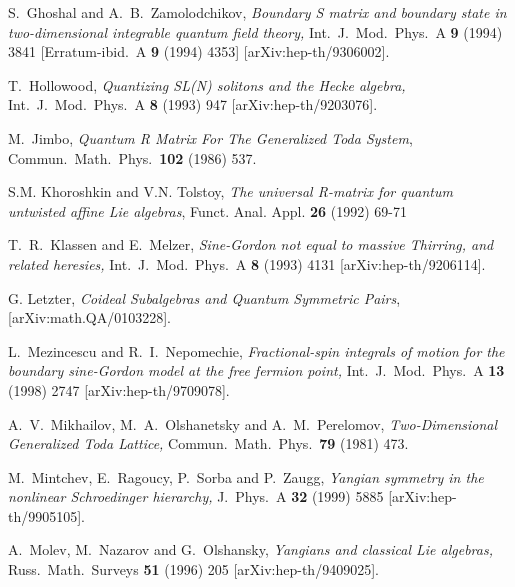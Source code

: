 \documentclass[a4paper,12pt]{article}
\numberwithin{equation}{section}
\begin{document}
{\begin{thebibliography}{99}
S.~Ghoshal and A.~B.~Zamolodchikov, \textit{Boundary S matrix and
boundary state in two-dimensional integrable quantum field
theory,} Int.\ J.\ Mod.\ Phys.\ A {\bf 9} (1994) 3841
[Erratum-ibid.\ A {\bf 9} (1994) 4353] [arXiv:hep-th/9306002].


T.~Hollowood, \textit{Quantizing SL(N) solitons and the Hecke
algebra,} Int.\ J.\ Mod.\ Phys.\ A {\bf 8} (1993) 947
[arXiv:hep-th/9203076].


M.~Jimbo, \textit{Quantum R Matrix For The Generalized Toda
System}, Commun.\ Math.\ Phys.\  {\bf 102} (1986) 537.

 S.M. Khoroshkin and V.N. Tolstoy, \textit{The
universal R-matrix for quantum untwisted affine Lie algebras},
Funct. Anal. Appl. {\bf 26} (1992) 69-71

T.~R.~Klassen and E.~Melzer, \textit{Sine-Gordon not equal to
massive Thirring, and related heresies,} Int.\ J.\ Mod.\ Phys.\ A
{\bf 8} (1993) 4131 [arXiv:hep-th/9206114].


 G. Letzter, \textit{Coideal Subalgebras and Quantum Symmetric
Pairs}, [arXiv:math.QA/0103228].

L.~Mezincescu and R.~I.~Nepomechie, \textit{Fractional-spin
integrals of motion for the boundary sine-Gordon model  at the
free fermion point,} Int.\ J.\ Mod.\ Phys.\ A {\bf 13} (1998) 2747
[arXiv:hep-th/9709078].


A.~V.~Mikhailov, M.~A.~Olshanetsky and A.~M.~Perelomov,
\textit{Two-Dimensional Generalized Toda Lattice,} Commun.\ Math.\
Phys.\  {\bf 79} (1981) 473.


M.~Mintchev, E.~Ragoucy, P.~Sorba and P.~Zaugg, \textit{Yangian
symmetry in the nonlinear Schroedinger hierarchy,} J.\ Phys.\ A
{\bf 32} (1999) 5885 [arXiv:hep-th/9905105].

A.~Molev, M.~Nazarov and G.~Olshansky, \textit{Yangians and
classical Lie algebras,} Russ.\ Math.\ Surveys {\bf 51} (1996) 205
[arXiv:hep-th/9409025].


\end{thebibliography}}
\end{document}
